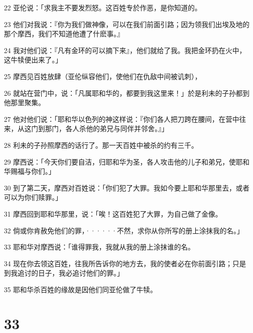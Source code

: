 \par 22 亚伦说：「求我主不要发烈怒。这百姓专於作恶，是你知道的。
\par 23 他们对我说：『你为我们做神像，可以在我们前面引路；因为领我们出埃及地的那个摩西，我们不知道他遭了什麽事。』
\par 24 我对他们说：『凡有金环的可以摘下来』，他们就给了我。我把金环扔在火中，这牛犊便出来了。」
\par 25 摩西见百姓放肆（亚伦纵容他们，使他们在仇敌中间被讥刺），
\par 26 就站在营门中，说：「凡属耶和华的，都要到我这里来！」於是利未的子孙都到他那里聚集。
\par 27 他对他们说：「耶和华以色列的神这样说：『你们各人把刀跨在腰间，在营中往来，从这门到那门，各人杀他的弟兄与同伴并邻舍。』」
\par 28 利未的子孙照摩西的话行了。那一天百姓中被杀的约有三千。
\par 29 摩西说：「今天你们要自洁，归耶和华为圣，各人攻击他的儿子和弟兄，使耶和华赐福与你们。」
\par 30 到了第二天，摩西对百姓说：「你们犯了大罪。我如今要上耶和华那里去，或者可以为你们赎罪。」
\par 31 摩西回到耶和华那里，说：「唉！这百姓犯了大罪，为自己做了金像。
\par 32 倘或你肯赦免他们的罪，······不然，求你从你所写的册上涂抹我的名。」
\par 33 耶和华对摩西说：「谁得罪我，我就从我的册上涂抹谁的名。
\par 34 现在你去领这百姓，往我所告诉你的地方去，我的使者必在你前面引路；只是到我追讨的日子，我必追讨他们的罪。」
\par 35 耶和华杀百姓的缘故是因他们同亚伦做了牛犊。

\chapter{33}

